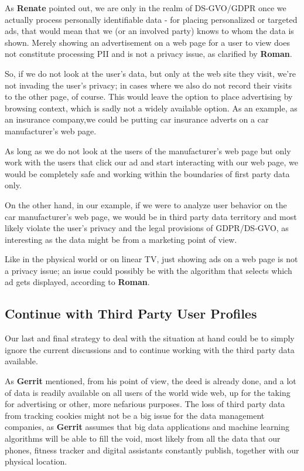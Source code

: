 As \textbf{Renate} pointed out, we are only in the realm of DS-GVO/GDPR once we actually process personally identifiable data - for placing personalized or targeted ads, that would mean that we (or an involved party) knows to whom the data is shown. Merely showing an advertisement on a web page for a user to view does not constitute processing PII and is not a privacy issue, as clarified by \textbf{Roman}.

So, if we do not look at the user's data, but only at the web site they visit, we're not invading the user's privacy; in cases where we also do not record their visits to the other page, of course. This would leave the option to place advertising by browsing context, which is sadly not a widely available option. As an example, as an insurance company,we could be putting car insurance adverts on a car manufacturer's web page. 

As long as we do not look at the users of the manufacturer's web page but only work with the users that click our ad and start interacting with our web page, we would be completely safe and working within the boundaries of first party data only.

On the other hand, in our example, if we were to analyze user behavior on the car manufacturer's web page, we would be in third party data territory and most likely violate the user's privacy and the legal provisions of GDPR/DS-GVO, as interesting as the data might be from a marketing point of view.

Like in the physical world or on linear TV, just showing ads on a web page is not a privacy issue; an issue could possibly be with the algorithm that selects which ad gets displayed, according to \textbf{Roman}.

\subsection{Continue with Third Party User Profiles}

Our last and final strategy to deal with the situation at hand could be to simply ignore the current discussions and to continue working with the third party data available.

As \textbf{Gerrit} mentioned, from his point of view, the deed is already done, and a lot of data is readily available on all users of the world wide web, up for the taking for advertising or other, more nefarious purposes. The loss of third party data from tracking cookies might not be a big issue for the data management companies, as \textbf{Gerrit} assumes that big data applications and machine learning algorithms will be able to fill the void, most likely from all the data that our phones, fitness tracker and digital assistants constantly publish, together with our physical location.

